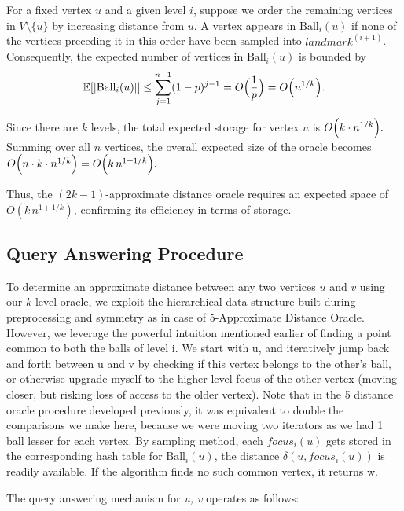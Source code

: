 \documentclass{article}
\begin{document}
For a fixed vertex \(u\) and a given level \(i\), suppose we order the remaining vertices in \(V \setminus \{u\}\) by increasing distance from \(u\). A vertex appears in \(\text{Ball}_i(u)\) if none of the vertices preceding it in this order have been sampled into \(landmark^{(i+1)}\). Consequently, the expected number of vertices in \(\text{Ball}_i(u)\) is bounded by
\[
\mathbb{E}[|\text{Ball}_i(u)|] \le \sum_{j=1}^{n-1}(1-p)^{j-1} = O\Bigl(\frac{1}{p}\Bigr) = O\Bigl(n^{1/k}\Bigr).
\]

Since there are \(k\) levels, the total expected storage for vertex \(u\) is
\(
O\Bigl(k \cdot n^{1/k}\Bigr).
\)\\
Summing over all \(n\) vertices, the overall expected size of the oracle becomes
\(
O\Bigl(n \cdot k \cdot n^{1/k}\Bigr) = O\Bigl(k\, n^{1+1/k}\Bigr).
\)

Thus, the \((2k-1)\)-approximate distance oracle requires an expected space of \(O(k\, n^{1+1/k})\), confirming its efficiency in terms of storage.

\subsection{Query Answering Procedure}

To determine an approximate distance between any two vertices \(u\) and \(v\) using our \(k\)-level oracle, we exploit the hierarchical data structure built during preprocessing and symmetry as in case of 5-Approximate Distance Oracle. However, we leverage the powerful intuition mentioned earlier of finding a point common to both the balls of level i. We start with u, and iteratively jump back and forth between u and v by checking if this vertex belongs to the other's ball, or otherwise upgrade myself to the higher level focus of the other vertex (moving closer, but risking loss of access to the older vertex). Note that in the 5 distance oracle procedure developed previously, it was equivalent to double the comparisons we make here, because we were moving two iterators as we had 1 ball lesser for each vertex. By sampling method, each \(focus_i(u)\) gets stored in the corresponding hash table for \(\text{Ball}_i(u)\), the distance \(\delta(u,focus_i(u))\) is readily available. If the algorithm finds no such common vertex, it returns w.

The query answering mechanism for \textit{u, v} operates as follows:
\end{document}
